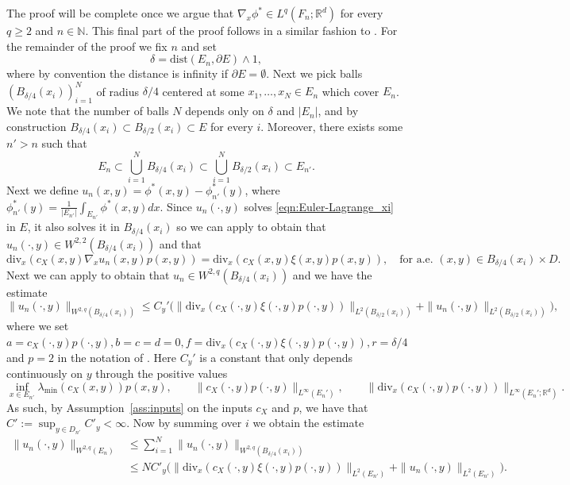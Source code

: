 \documentclass{article}
\makeatletter
\theoremstyle{plain}
\theoremstyle{definition}
\newcommand{\R}{\mathbb{R}}
\newcommand{\N}{\mathbb{N}}
\numberwithin{lem}{section}
\renewenvironment{proof}[1][\proofname] {\par\pushQED{\qed}\normalfont\topsep6\p@\@plus6\p@\relax\trivlist\item[\hskip\labelsep\bfseries#1\@addpunct{.}]\ignorespaces}{\popQED\endtrivlist\@endpefalse}
\makeatother
\begin{document}
\begin{proof}
The proof will be complete once we argue that $\nabla_x \phi^* \in L^q(F_n;\R^d)$ for every $q \geq 2$ and $n \in \N$. This final part of the proof follows in a similar fashion to \cite[Theorem~A.3]{itkin2025ergodic}. For the remainder of the proof we fix $n$ and set 
\[\delta = \mathrm{dist}(E_n,\partial E) \land 1,\]
where by convention the distance is infinity if $\partial E = \emptyset$. Next we pick balls $(B_{\delta/4}(x_i))_{i=1}^N$ of radius $\delta/4$ centered at some $x_1,\dots,x_N \in E_n$ which cover $E_n$. We note that the number of balls $N$ depends only on $\delta$ and $|E_n|$, and by construction $B_{\delta/4}(x_i) \subset  B_{\delta/2}(x_i) \subset E$ for every $i$. Moreover, there exists some $n' > n$ such that
\[E_n \subset \bigcup_{i=1}^N B_{\delta/4}(x_i)  \subset \bigcup_{i=1}^N B_{\delta/2}(x_i) \subset E_{n'}.\]
Next we define $u_n(x,y) = \phi^*(x,y) - \phi^*_{n'}(y)$, where $\phi^*_{n'}(y) = \frac{1}{|E_{n'}|}\int_{E_{n'}}\phi^*(x,y)dx$. Since $u_n(\cdot,y)$ solves \eqref{eqn:Euler-Lagrange_xi} in $E$, it also solves it in $B_{\delta/4}(x_i)$ so we can apply \cite[Theorem~8.8]{gilbargelliptic2001} to obtain that $u_n(\cdot,y) \in W^{2,2}(B_{\delta/4}(x_i))$ and that
\[\mathrm{div}_x(c_X(x,y)\nabla_x u_n(x,y)p(x,y)) = \mathrm{div}_x(c_X(x,y)\xi(x,y)p(x,y)), \quad \text{for a.e.\ } (x,y) \in  B_{\delta/4}(x_i) \times D.\]
Next we can apply \cite[Theorem~11.2.3]{krylovsobolev2008} to obtain that $u_n \in W^{2,q}(B_{\delta/4}(x_i))$ and we have the estimate
 \[\|u_n(\cdot,y)\|_{W^{2,q}(B_{\delta/4}(x_i))} \leq C_y'\big(\|\mathrm{div}_x(c_X(\cdot,y)\xi(\cdot,y)p(\cdot,y))\|_{L^2(B_{\delta/2}(x_i))} + \|u_n(\cdot,y)\|_{L^2(B_{\delta/2}(x_i))}\big), \]
 where we set $a = c_X(\cdot,y)p(\cdot,y), b = c = d =0, f = \mathrm{div}_x(c_X(\cdot,y)\xi(\cdot,y)p(\cdot,y)), r = \delta/4$ and $p=2$ in the notation of \cite{krylovsobolev2008}. Here $C_y'$ is a constant that only depends continuously on $y$ through the positive values
 \[ \inf_{x \in E_{n'}}\lambda_{\min}(c_X(x,y))p(x,y), \qquad \|c_X(\cdot,y)p(\cdot,y)\|_{L^\infty(E_n')}, \qquad \|\mathrm{div}_x(c_X(\cdot,y)p(\cdot,y))\|_{L^\infty(E_n';\R^d)}.\]
 As such, by Assumption~\ref{ass:inputs} on the inputs $c_X$ and $p$, we have that $C' := \sup_{y \in D_{n'}} C'_y < \infty$.
 Now by summing over $i$ we obtain the estimate
 \begin{align} \|u_n(\cdot,y)\|_{W^{2,q}(E_n)} &  \leq \sum_{i=1}^N \|u_n(\cdot,y)\|_{W^{2,q}(B_{\delta/4}(x_i))} \\
 & \leq  NC'_y\big(\|\mathrm{div}_x(c_X(\cdot,y)\xi(\cdot,y)p(\cdot,y))\|_{L^2(E_{n'})} + \|u_n(\cdot,y)\|_{L^2(E_{n'})}\big). 

\end{align}
\end{proof}
\end{document}
